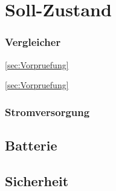 \section{Soll-Zustand}




\subsubsection{Vergleicher}
\ref{sec:Vorpruefung}

\ref{sec:Vorpruefung}

\subsubsection{Stromversorgung}


\subsection{Batterie}


\subsection{Sicherheit}



